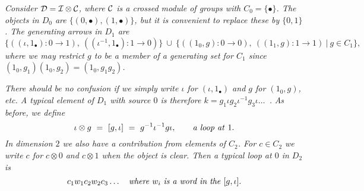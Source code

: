 \medskip
\begin{example}
\emph{Consider $\mathcal{D} = \mathcal{I}\otimes\mathcal{C}$, where $\mathcal{C}$ is a crossed module 
of groups with $C_0=\{\bullet\}$. 
The objects in $D_0$ are $\{(0,\bullet),(1,\bullet)\}$, 
but it is convenient to replace these by $\{0,1\}$. 
The generating arrows in $D_1$ are}
$$
\{ ((\iota,1_{\bullet}) : 0 \to 1),~ ((\iota^{-1},1_{\bullet}) : 1 \to 0)\} 
~\cup~
\{((1_0,g) : 0 \to 0),~ ((1_1,g) : 1 \to 1) ~|~ g \in C_1 \}, 
$$
\emph{where we may restrict $g$ to be a member of a generating set for $C_1$ 
since $(1_0,g_1)(1_0,g_2) = (1_0,g_1g_2)$.} 

\begin{figure}[htbp]
\begin{center}

\label{figure:itensorc}
\end{center}
\end{figure}

\emph{There should be no confusion if we simply write $\iota$ for 
$(\iota,1_{\bullet})$ and $g$ for $(1_0,g)$, etc. 
A typical element of $D_1$ with source $0$ is therefore 
$k = g_1 \iota g_2 \iota^{-1} g_3 \iota \ldots$~.}
\emph{As before, we define} 
$$
\iota \otimes g ~=~ [g,\iota] ~=~ g^{-1}\iota^{-1}g\iota, 
\qquad\text{\emph{a loop at}}~ 1. 
$$
\emph{In dimension $2$ we also have a contribution from elements of $C_2$. 
For $c \in C_2$ we write $c$ for $c \otimes 0$ and $c \otimes 1$ 
when the object is clear. 
Then a typical loop at $0$ in $D_2$ is} 
$$
c_1 w_1 c_2 w_2 c_3 \ldots 
\quad\text{\emph{where}}~ w_i ~\text{\emph{is a word in the}}~ [g,\iota]. 
$$
\end{example}

